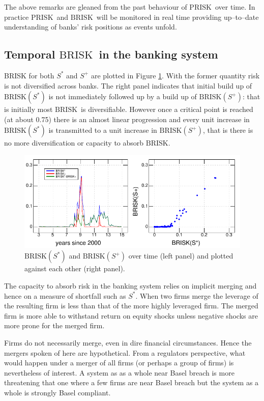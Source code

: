 \documentclass[authoryear]{elsarticle}
\newcommand{\fref}[1]{Figure \ref{#1}}
\newcommand{\br}{\ensuremath{\mathrm{BRISK}}}
\newcommand{\pr}{\ensuremath{\mathrm{PRISK}}}
\begin{document}
The above remarks are gleaned from the past behaviour of \pr\ over time.   In practice \pr\ and  \br\  will be monitored in real time providing up--to--date understanding of banks' risk positions as events unfold.   


\subsection{Temporal \br\  in the banking system}\label{Baggregate}

BRISK for both $S^*$ and $S^+$ are plotted in \fref{muqsB}.  With the former quantity risk is not diversified across banks.   The right panel indicates that initial build up of  $\br(S^*)$ is not immediately followed up by a build up of $\br(S^+)$: that is initially most \br\ is diversifiable.   However once a critical point is reached (at about 0.75) there is an almost linear progression and every unit increase in $\br(S^*)$ is transmitted to a unit increase in $\br(S^+)$, that is there is no more diversification or capacity to absorb \br.

\begin{figure}[htbp]
\begin{center}
\includegraphics[width=12cm]{figures/muqsB.pdf}
\caption{$\br(S^*)$ and $\br(S^+)$ over time (left panel) and plotted against each other (right panel).}\label{muqsB}
\end{center}
\end{figure}

The capacity to absorb risk in the banking system relies on implicit merging and hence on a measure of shortfall such as $S^*$.    When two firms merge the leverage of the resulting firm is less than that of the more highly leveraged firm.   The merged firm is more able to withstand return on equity shocks  unless negative shocks are more prone for the merged firm.   

Firms do not necessarily merge, even in dire financial circumstances.   Hence the mergers spoken of here are hypothetical.   From a regulators perspective, what would happen under a merger of all firms (or perhaps a group of firms) is nevertheless of interest.   A system as as a whole near Basel breach is more threatening that one where a few firms are near Basel breach but the system as a whole is strongly Basel compliant.
\end{document}
